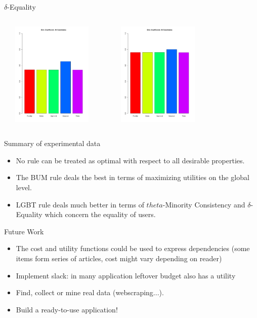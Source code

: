 \documentclass{beamer}
\begin{document}
\begin{frame}{$\delta$-Equality}
	\begin{columns}
             \centering
             \includegraphics[height=5cm, width=5cm]{Gini_Coefficient_10_Candidates.pdf}
             
	 \centering
             \includegraphics[height=5cm, width=5cm]{Gini_Coefficient_20_Candidates.pdf}
         \end{columns} 
       
\end{frame}
\begin{frame}{Summary of experimental data}
	
\begin{itemize}
\item No rule can be treated as optimal with respect to all desirable properties.
\item The BUM rule deals the best in terms of maximizing utilities on the global level.

\item LGBT rule deals much better in terms of $theta$-Minority Consistency and $\delta$-Equality which concern the equality of users.
\end{itemize}
\end{frame}


\begin{frame}{Future Work}

\begin{itemize}
	\item The cost and utility functions could be used to express dependencies (some items form series of articles, cost might vary depending on reader)
	\item Implement slack: in many application leftover budget also has a utility
	\item Find, collect or mine real data (webscraping...).
	\item Build a ready-to-use application!
	
\end{itemize}
	
\end{frame}
\end{document}
